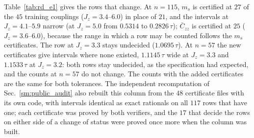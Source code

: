 \documentclass[aps,prx,onecolumn,10pt,nofootinbib,longbibliography,floatfix]{revtex4-2}
\theoremstyle{remark}
\newcommand{\Jz}{J_z}
\newcommand{\ms}{m_s}
\newcommand{\Czz}{\bar C_{zz}}
\begin{document}
Table~\ref{tab:rd_e1} gives the rows that change. At $n=115$, $\ms$ is certified at $27$ of the $45$ training %
couplings ($\Jz=3.4$--$6.0$) in place of $21$, and the intervals at $\Jz=4.1$--$5.9$ narrow (at $\Jz=5.0$ from %
$0.5314$ to $0.2826\,\tau$); $\Czz$ is certified at $25$ ($\Jz=3.6$--$6.0$), because the range in which a row may be %
counted follows the $\ms$ certificates. The row at $\Jz=3.3$ stays undecided ($1.0695\,\tau$). At $n=57$ the new %
certificates give intervals where none existed, $1.1145\,\tau$ wide at $\Jz=3.3$ and $1.1533\,\tau$ at $\Jz=3.2$: both %
rows stay undecided, as the specification had expected, and the counts at $n=57$ do not change. The counts with the
added certificates are the same for both tolerances. The independent recomputation of Sec.~\ref{sm:public_audit}
also rebuilt this column from the $48$ certificate files with its own code, with intervals identical as exact %
rationals on all $117$ rows that have one; each certificate was proved by both verifiers, %
and the $17$ that decide the rows on either side of a change of status were proved once more when the column was %
built.

\def\SMcap{Rows changed by the certificates added after the declaration. ``Primary column'': width over $\tau$ and %
status with the certificates that existed when the analysis was declared. The other columns are as in
Table~\ref{tab:rd_exact_ms}, with the added certificates in the pool. For $\Czz$ the interval is unchanged; only
the range in which a row may be counted grows.}\def\SMlab{tab:rd_e1}

\end{document}

